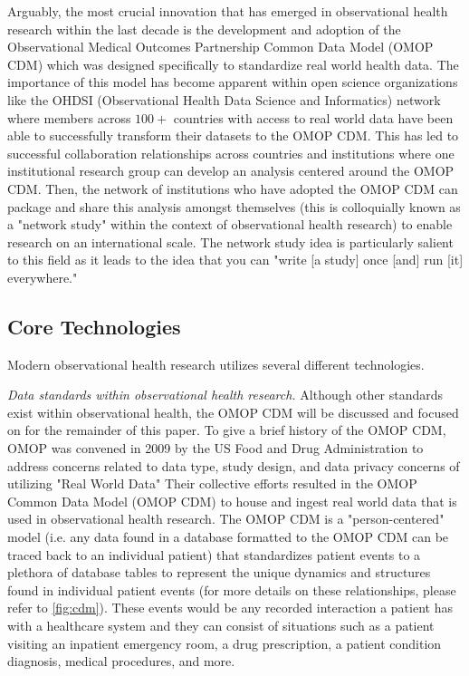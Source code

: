 \documentclass{juliacon}
\begin{document}
Arguably, the most crucial innovation that has emerged in observational health research within the last decade is the development and adoption of the Observational Medical Outcomes Partnership Common Data Model (OMOP CDM) which was designed specifically to standardize real world health data. \cite{overhage2012validation}
The importance of this model has become apparent within open science organizations like the OHDSI (Observational Health Data Science and Informatics) network where members across $100+$ countries \cite{sachsonOurJourney2023} with access to real world data have been able to successfully transform their datasets to the OMOP CDM.
This has led to successful collaboration relationships \cite{roseFindingAnswersBig2008} across countries and institutions where one institutional research group can develop an analysis centered around the OMOP CDM.
Then, the network of institutions who have adopted the OMOP CDM can package and share this analysis amongst themselves (this is colloquially known as a "network study" within the context of observational health research) to enable research on an international scale.
The network study idea is particularly salient to this field as it leads to the idea that you can "write [a study] once [and] run [it] everywhere."\footnotemark


\subsection{Core Technologies}

Modern observational health research utilizes several different technologies.

\textit{Data standards within observational health research.} Although other standards exist within observational health, the OMOP CDM will be discussed and focused on for the remainder of this paper.
To give a brief history of the OMOP CDM, OMOP was convened in 2009 by the US Food and Drug Administration to address concerns related to data type, study design, and data privacy concerns of utilizing "Real World Data" \cite{ohdsi2019book} \cite{FDARealWorldEvidence}
Their collective efforts resulted in the OMOP Common Data Model (OMOP CDM) to house and ingest real world data that is used in observational health research.
The OMOP CDM is a "person-centered" model (i.e. any data found in a database formatted to the OMOP CDM can be traced back to an individual patient) that standardizes patient events to a plethora of database tables to represent the unique dynamics and structures found in individual patient events (for more details on these relationships, please refer to \ref{fig:cdm}).
These events would be any recorded interaction a patient has with a healthcare system and they can consist of situations such as a patient visiting an inpatient emergency room, a drug prescription, a patient condition diagnosis, medical procedures, and more.
\end{document}
